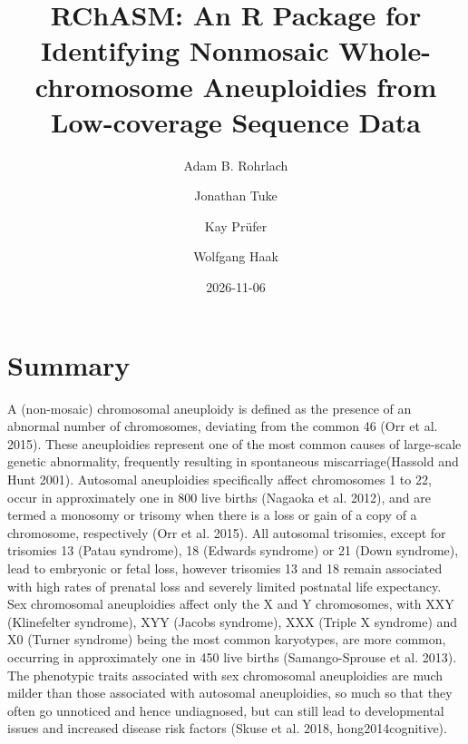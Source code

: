 \documentclass[
  letterpaper,
  DIV=11,
  numbers=noendperiod]{scrartcl}
\title{RChASM: An R Package for Identifying Nonmosaic Whole-chromosome
Aneuploidies from Low-coverage Sequence Data}
\author{Adam B. Rohrlach \and Jonathan Tuke \and Kay
Prüfer \and Wolfgang Haak}
\date{2026-11-06}
\begin{document}
\maketitle


\newcommand{\bm}[1]{\boldsymbol{#1}}
\newcommand{\apprsim}{%
  \mathrel{\ooalign{\hss$\sim$\hss\cr
                    \hidewidth\raise0.65ex\hbox{$\cdot$}\hidewidth\cr
                    \hidewidth\lower0.65ex\hbox{$\cdot$}\hidewidth}}%
}

\section{Summary}\label{summary}

A (non-mosaic) chromosomal aneuploidy is defined as the presence of an
abnormal number of chromosomes, deviating from the common 46 (Orr et al.
2015). These aneuploidies represent one of the most common causes of
large-scale genetic abnormality, frequently resulting in spontaneous
miscarriage(Hassold and Hunt 2001). Autosomal aneuploidies specifically
affect chromosomes 1 to 22, occur in approximately one in 800 live
births (Nagaoka et al. 2012), and are termed a monosomy or trisomy when
there is a loss or gain of a copy of a chromosome, respectively (Orr et
al. 2015). All autosomal trisomies, except for trisomies 13 (Patau
syndrome), 18 (Edwards syndrome) or 21 (Down syndrome), lead to
embryonic or fetal loss, however trisomies 13 and 18 remain associated
with high rates of prenatal loss and severely limited postnatal life
expectancy. Sex chromosomal aneuploidies affect only the X and Y
chromosomes, with XXY (Klinefelter syndrome), XYY (Jacobs syndrome), XXX
(Triple X syndrome) and X0 (Turner syndrome) being the most common
karyotypes, are more common, occurring in approximately one in 450 live
births ({Samango-Sprouse et al.} 2013). The phenotypic traits associated
with sex chromosomal aneuploidies are much milder than those associated
with autosomal aneuploidies, so much so that they often go unnoticed and
hence undiagnosed, but can still lead to developmental issues and
increased disease risk factors (Skuse et al. 2018, hong2014cognitive).
\end{document}
